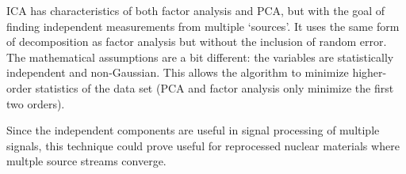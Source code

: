 \Gls{ICA} has characteristics of both factor analysis and \gls{PCA}, but with
the goal of finding independent measurements from multiple `sources'.  It uses
the same form of decomposition as factor analysis but without the inclusion of
random error. The mathematical assumptions are a bit different: the variables
are statistically independent and non-Gaussian.  This allows the algorithm to
minimize higher-order statistics of the data set (\gls{PCA} and factor analysis
only minimize the first two orders).

Since the independent components are useful in signal processing of multiple
signals, this technique could prove useful for reprocessed nuclear materials
where multple source streams converge. 

